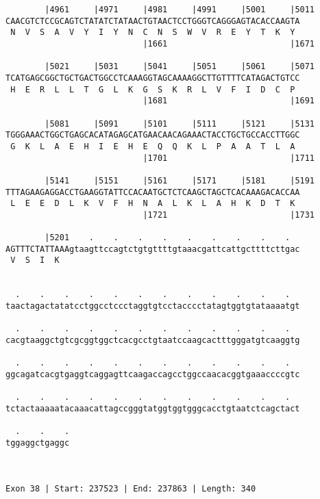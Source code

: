 \documentclass{article}
\begin{document}
\begin{Verbatim}
        |4961     |4971     |4981     |4991     |5001     |5011
CAACGTCTCCGCAGTCTATATCTATAACTGTAACTCCTGGGTCAGGGAGTACACCAAGTA
 N  V  S  A  V  Y  I  Y  N  C  N  S  W  V  R  E  Y  T  K  Y 
                            |1661                         |1671
  
        |5021     |5031     |5041     |5051     |5061     |5071
TCATGAGCGGCTGCTGACTGGCCTCAAAGGTAGCAAAAGGCTTGTTTTCATAGACTGTCC
 H  E  R  L  L  T  G  L  K  G  S  K  R  L  V  F  I  D  C  P 
                            |1681                         |1691
  
        |5081     |5091     |5101     |5111     |5121     |5131
TGGGAAACTGGCTGAGCACATAGAGCATGAACAACAGAAACTACCTGCTGCCACCTTGGC
 G  K  L  A  E  H  I  E  H  E  Q  Q  K  L  P  A  A  T  L  A 
                            |1701                         |1711
  
        |5141     |5151     |5161     |5171     |5181     |5191
TTTAGAAGAGGACCTGAAGGTATTCCACAATGCTCTCAAGCTAGCTCACAAAGACACCAA
 L  E  E  D  L  K  V  F  H  N  A  L  K  L  A  H  K  D  T  K 
                            |1721                         |1731
  
        |5201    .    .    .    .    .    .    .    .    .  
AGTTTCTATTAAAgtaagttccagtctgtgttttgtaaacgattcattgcttttcttgac
 V  S  I  K                                                 
                                                            
  
  .    .    .    .    .    .    .    .    .    .    .    .  
taactagactatatcctggcctccctaggtgtcctacccctatagtggtgtataaaatgt
                                                            
  .    .    .    .    .    .    .    .    .    .    .    .  
cacgtaaggctgtcgcggtggctcacgcctgtaatccaagcactttgggatgtcaaggtg
                                                            
  .    .    .    .    .    .    .    .    .    .    .    .  
ggcagatcacgtgaggtcaggagttcaagaccagcctggccaacacggtgaaaccccgtc
                                                            
  .    .    .    .    .    .    .    .    .    .    .    .  
tctactaaaaatacaaacattagccgggtatggtggtgggcacctgtaatctcagctact
                                                            
  .    .    .
tggaggctgaggc
             
             
 
Exon 38 | Start: 237523 | End: 237863 | Length: 340




\end{Verbatim}
\end{document}
